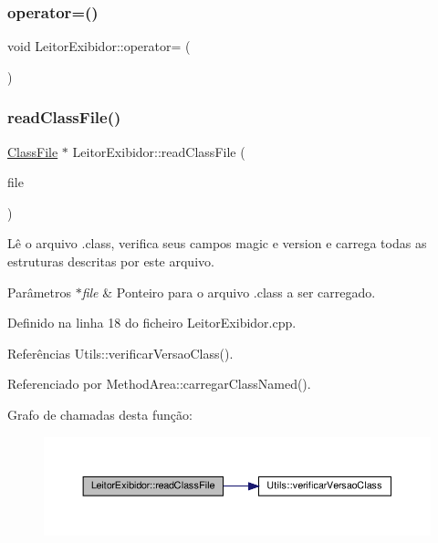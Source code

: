 \subsubsection{\texorpdfstring{operator=()}{operator=()}}
{\footnotesize\ttfamily void Leitor\+Exibidor\+::operator= (\begin{DoxyParamCaption}\item[{\hyperlink{classLeitorExibidor}{Leitor\+Exibidor} const \&}]{ }\end{DoxyParamCaption})\hspace{0.3cm}{\ttfamily [private]}}

\mbox{\label{classLeitorExibidor_af6f4f84cbfaf72e6673e1dc42023b308}} 
\subsubsection{\texorpdfstring{read\+Class\+File()}{readClassFile()}}
{\footnotesize\ttfamily \hyperlink{classClassFile}{Class\+File} $\ast$ Leitor\+Exibidor\+::read\+Class\+File (\begin{DoxyParamCaption}\item[{F\+I\+LE $\ast$}]{file }\end{DoxyParamCaption})}

Lê o arquivo .class, verifica seus campos magic e version e carrega todas as estruturas descritas por este arquivo. 
\begin{DoxyParams}{Parâmetros}
{\em $\ast$file} & Ponteiro para o arquivo .class a ser carregado. \\
\hline
\end{DoxyParams}


Definido na linha 18 do ficheiro Leitor\+Exibidor.\+cpp.



Referências Utils\+::verificar\+Versao\+Class().



Referenciado por Method\+Area\+::carregar\+Class\+Named().

Grafo de chamadas desta função\+:\nopagebreak
\begin{figure}[H]
\begin{center}
\leavevmode
\includegraphics[width=350pt]{classLeitorExibidor_af6f4f84cbfaf72e6673e1dc42023b308_cgraph}
\end{center}
\end{figure}
\mbox{\label{classLeitorExibidor_af679ae83326347418cd0d3c90776d7a3}} 
